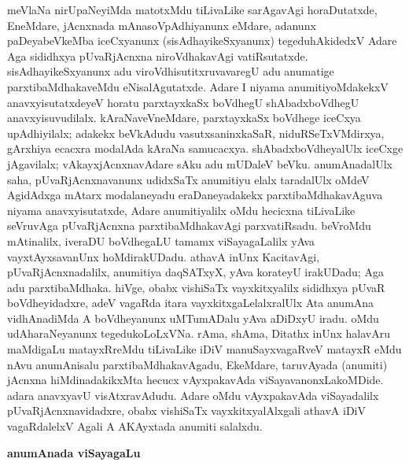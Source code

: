 meVlaNa nirUpaNeyiMda matotxMdu tiLivaLike sarAgavAgi horaDutatxde, EneMdare, jAcnxnada mAnasoVpAdhiyanunx eMdare, adanunx paDeyabeVkeMba iceCxyanunx (sisAdhayikeSxyanunx) tegeduhAkidedxV Adare Aga sididhxya pUvaRjAcnxna niroVdhakavAgi vatiRsutatxde. sisAdhayikeSxyanunx adu viroVdhisutitxruvavaregU adu anumatige parxtibaMdhakaveMdu eNisalAgutatxde. Adare I niyama anumitiyoMdakekxV anavxyisutatxdeyeV horatu parxtayxkaSx boVdhegU shAbadxboVdhegU anavxyisuvudilalx. kAraNaveVneMdare, parxtayxkaSx boVdhege iceCxya upAdhiyilalx; adakekx beVkAdudu vasutxsaninxkaSaR, niduRSeTxVMdirxya, gArxhiya ecacxra modalAda kAraNa samucacxya. shAbadxboVdheyalUlx iceCxge jAgavilalx; vAkayxjAcnxnavAdare sAku adu mUDaleV beVku. anumAnadalUlx saha, pUvaRjAcnxnavanunx udidxSaTx anumitiyu elalx taradalUlx oMdeV AgidAdxga mAtarx modalaneyadu eraDaneyadakekx parxtibaMdhakavAguva niyama anavxyisutatxde, Adare anumitiyalilx oMdu hecicxna tiLivaLike seVruvAga pUvaRjAcnxna parxtibaMdhakavAgi parxvatiRsadu. beVroMdu mAtinalilx, iveraDU boVdhegaLU tamamx viSayagaLalilx yAva vayxtAyxsavanUnx hoMdirakUDadu. athavA inUnx KacitavAgi, pUvaRjAcnxnadalilx, anumitiya daqSATxyX, yAva korateyU irakUDadu; Aga adu parxtibaMdhaka. hiVge, obabx vishiSaTx vayxkitxyalilx sididhxya pUvaR boVdheyidadxre, adeV vagaRda itara vayxkitxgaLelalxralUlx Ata anumAna vidhAnadiMda A boVdheyanunx uMTumADalu yAva aDiDxyU iradu. oMdu udAharaNeyanunx tegedukoLoLxVNa. rAma, shAma, Ditathx inUnx halavAru maMdigaLu matayxRreMdu tiLivaLike iDiV manuSayxvagaRveV matayxR eMdu nAvu anumAnisalu parxtibaMdhakavAgadu, EkeMdare, taruvAyada (anumiti) jAcnxna hiMdinadakikxMta hecucx vAyxpakavAda viSayavanonxLakoMDide. adara anavxyavU visAtxravAdudu. Adare oMdu vAyxpakavAda viSayadalilx pUvaRjAcnxnavidadxre, obabx vishiSaTx vayxkitxyalAlxgali athavA iDiV vagaRdalelxV Agali A AKAyxtada anumiti salalxdu.

\bigskip
\begin{center}
{\Large\bf anumAnada viSayagaLu}
\end{center}

